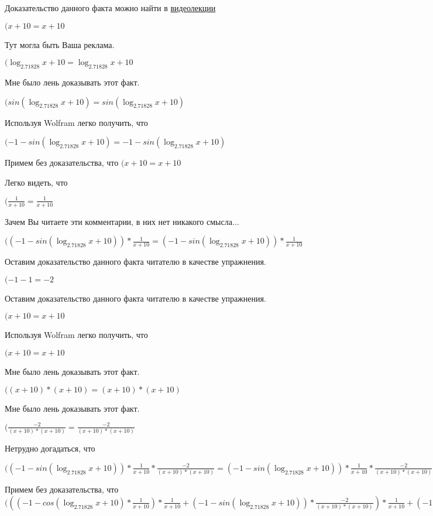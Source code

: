 \documentclass[12pt,a4paper,fleqn]{article}
\theoremstyle{definition}
\begin{document}
Доказательство данного факта можно найти в \href{https://www.youtube.com/watch?v=dQw4w9WgXcQ}{видеолекции}

$( x  +  10  =  x  +  10 $

Тут могла быть Ваша реклама.

$(\log_{ 2.71828 }{ x  +  10 } = \log_{ 2.71828 }{ x  +  10 }$

Мне было лень доказывать этот факт.

$(sin(\log_{ 2.71828 }{ x  +  10 }) = sin(\log_{ 2.71828 }{ x  +  10 })$

Используя Wolfram легко получить, что

$( -1  - sin(\log_{ 2.71828 }{ x  +  10 }) =  -1  - sin(\log_{ 2.71828 }{ x  +  10 })$

Примем без доказательства, что
$( x  +  10  =  x  +  10 $

Легко видеть, что

$(\frac{ 1 }{ x  +  10 }
 = \frac{ 1 }{ x  +  10 }
$

Зачем Вы читаете эти комментарии, в них нет никакого смысла...

$(( -1  - sin(\log_{ 2.71828 }{ x  +  10 })) * \frac{ 1 }{ x  +  10 }
 = ( -1  - sin(\log_{ 2.71828 }{ x  +  10 })) * \frac{ 1 }{ x  +  10 }
$

Оставим доказательство данного факта читателю в качестве упражнения.

$( -1  -  1  =  -2 $

Оставим доказательство данного факта читателю в качестве упражнения.

$( x  +  10  =  x  +  10 $

Используя Wolfram легко получить, что

$( x  +  10  =  x  +  10 $

Мне было лень доказывать этот факт.

$(( x  +  10 ) * ( x  +  10 ) = ( x  +  10 ) * ( x  +  10 )$

Мне было лень доказывать этот факт.

$(\frac{ -2 }{( x  +  10 ) * ( x  +  10 )}
 = \frac{ -2 }{( x  +  10 ) * ( x  +  10 )}
$

Нетрудно догадаться, что

$(( -1  - sin(\log_{ 2.71828 }{ x  +  10 })) * \frac{ 1 }{ x  +  10 }
 * \frac{ -2 }{( x  +  10 ) * ( x  +  10 )}
 = ( -1  - sin(\log_{ 2.71828 }{ x  +  10 })) * \frac{ 1 }{ x  +  10 }
 * \frac{ -2 }{( x  +  10 ) * ( x  +  10 )}
$

Примем без доказательства, что
$((( -1  - cos(\log_{ 2.71828 }{ x  +  10 }) * \frac{ 1 }{ x  +  10 }
) * \frac{ 1 }{ x  +  10 }
 + ( -1  - sin(\log_{ 2.71828 }{ x  +  10 })) * \frac{ -2 }{( x  +  10 ) * ( x  +  10 )}
) * \frac{ 1 }{ x  +  10 }
 + ( -1  - sin(\log_{ 2.71828 }{ x  +  10 })) * \frac{ 1 }{ x  +  10 }
 * \frac{ -2 }{( x  +  10 ) * ( x  +  10 )}
 = (( -1  - cos(\log_{ 2.71828 }{ x  +  10 }) * \frac{ 1 }{ x  +  10 }
) * \frac{ 1 }{ x  +  10 }
 + ( -1  - sin(\log_{ 2.71828 }{ x  +  10 })) * \frac{ -2 }{( x  +  10 ) * ( x  +  10 )}
) * \frac{ 1 }{ x  +  10 }
 + ( -1  - sin(\log_{ 2.71828 }{ x  +  10 })) * \frac{ 1 }{ x  +  10 }
 * \frac{ -2 }{( x  +  10 ) * ( x  +  10 )}
$
\end{document}
